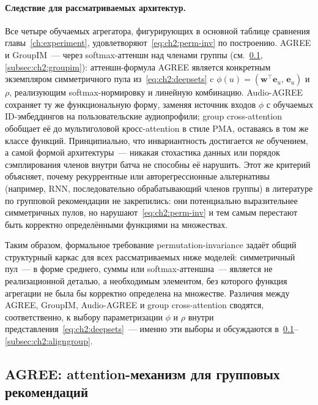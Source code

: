 \paragraph{Следствие для рассматриваемых архитектур.} Все четыре обучаемых агрегатора, фигурирующих в основной таблице сравнения главы~\ref{ch:experiment}, удовлетворяют~\eqref{eq:ch2:perm-inv} по построению. AGREE и GroupIM~--- через softmax-аттеншн над членами группы (см.~\ref{subsec:ch2:agree}, \ref{subsec:ch2:groupim}): аттеншн-формула AGREE является конкретным экземпляром симметричного пула из~\eqref{eq:ch2:deepsets} c $\phi(u) = (\mathbf{w}^\top \mathbf{e}_u,\, \mathbf{e}_u)$ и $\rho$, реализующим softmax-нормировку и линейную комбинацию. Audio-AGREE сохраняет ту же функциональную форму, заменяя источник входов $\phi$ с обучаемых ID-эмбеддингов на пользовательские аудиопрофили; group cross-attention обобщает её до мультиголовой кросс-attention в стиле PMA, оставаясь в том же классе функций. Принципиально, что инвариантность достигается \emph{не} обучением, а самой формой архитектуры~--- никакая стохастика данных или порядок сэмплирования членов внутри батча не способны её нарушить. Этот же критерий объясняет, почему рекуррентные или авторегрессионные альтернативы (например, RNN, последовательно обрабатывающий членов группы) в литературе по групповой рекомендации не закрепились: они потенциально выразительнее симметричных пулов, но нарушают~\eqref{eq:ch2:perm-inv} и тем самым перестают быть корректно определёнными функциями на множествах.

Таким образом, формальное требование permutation-invariance задаёт общий структурный каркас для всех рассматриваемых ниже моделей: симметричный пул~--- в форме среднего, суммы или softmax-аттеншна~--- является не реализационной деталью, а необходимым элементом, без которого функция агрегации не была бы корректно определена на множестве. Различия между AGREE, GroupIM, Audio-AGREE и group cross-attention сводятся, соответственно, к выбору параметризации $\phi$ и $\rho$ внутри представления~\eqref{eq:ch2:deepsets}~--- именно эти выборы и обсуждаются в~\ref{subsec:ch2:agree}--\ref{subsec:ch2:aligngroup}.

\subsection{AGREE: attention-механизм для групповых рекомендаций}
\label{subsec:ch2:agree}

